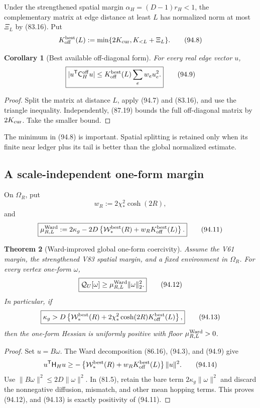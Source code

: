 \documentclass[11pt]{article}
\newtheorem{theorem}{Theorem}[section]
\newtheorem{corollary}[theorem]{Corollary}
\theoremstyle{remark}
\begin{document}
Under the strengthened spatial margin
\(\alpha_H=(D-1)r_H<1\), the complementary matrix at edge distance at
least \(L\) has normalized norm at most \(\Xi_L\) by (83.16).  Put
\[
 K_{\rm off}^{\rm best}(L)
 :=\min\{2K_{\rm cur},K_{<L}+\Xi_L\}.                \tag{94.8}
\]

\begin{corollary}[Best available off-diagonal form]
\label{cor:v17v94-off}
For every real edge vector \(u\),
\[
\boxed{
 |u^{\mathsf T}\mathsf C_H^{\rm off}u|
 \leq K_{\rm off}^{\rm best}(L)
        \sum_ew_eu_e^2.}                            \tag{94.9}
\]
\end{corollary}

\begin{proof}
Split the matrix at distance \(L\), apply (94.7) and (83.16), and use
the triangle inequality.  Independently, (87.19) bounds the full
off-diagonal matrix by \(2K_{\rm cur}\).  Take the smaller bound.
\end{proof}

The minimum in (94.8) is important.  Spatial splitting is retained
only when its finite near ledger plus its tail is better than the
global normalized estimate.

\subsection{A scale-independent one-form margin}

On \(\Omega_R\), put
\[
 w_R:=2\chi_*^2\cosh(2R),                            \tag{94.10}
\]
and
\[
\boxed{
 \mu_{R,L}^{\rm Ward}
 :=2\kappa_g-2D\left\{
 \mathcal W_*^{\rm best}(R)
 +w_RK_{\rm off}^{\rm best}(L)
 \right\}.}                                        \tag{94.11}
\]

\begin{theorem}[Ward-improved global one-form coercivity]
\label{thm:v17v94-coercivity}
Assume the V61 margin, the strengthened V83 spatial margin, and a
fixed environment in \(\Omega_R\).  For every vertex one-form
\(\omega\),
\[
\boxed{
 \mathcal Q_U[\omega]
 \geq\mu_{R,L}^{\rm Ward}\|\omega\|_2^2.}           \tag{94.12}
\]
In particular, if
\[
\boxed{
 \kappa_g>D\left\{
 \mathcal W_*^{\rm best}(R)
 +2\chi_*^2\cosh(2R)K_{\rm off}^{\rm best}(L)
 \right\},}                                        \tag{94.13}
\]
then the one-form Hessian is uniformly positive with floor
\(\mu_{R,L}^{\rm Ward}>0\).
\end{theorem}

\begin{proof}
Set \(u=B\omega\).  The Ward decomposition (86.16), (94.3), and
(94.9) give
\[
 u^{\mathsf T}\mathsf H_Hu
 \geq-\left\{
 \mathcal W_*^{\rm best}(R)
 +w_RK_{\rm off}^{\rm best}(L)
 \right\}\|u\|^2.                                  \tag{94.14}
\]
Use \(\|B\omega\|^2\leq2D\|\omega\|^2\).  In (81.5), retain the
bare term \(2\kappa_g\|\omega\|^2\) and discard the nonnegative
diffusion, mismatch, and other mean hopping terms.  This proves
(94.12), and (94.13) is exactly positivity of (94.11).
\end{proof}
\end{document}
